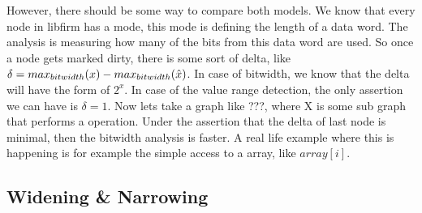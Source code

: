 However, there should be some way to compare both models. We know that every node in libfirm has a mode, this mode is defining the length of a data word. The analysis is measuring how many of the bits from this data word are used. So once a node gets marked dirty, there is some sort of delta, like $ \delta = max _{bitwidth}(\textsc{}x) - max _{bitwidth}(\hat{x}) $.
In case of bitwidth, we know that the delta will have the form of $2^x$. In case of the value range detection, the only assertion we can have is $\delta = 1$.
Now lets take a graph like ???, where X is some sub graph that performs a operation. Under the assertion that the delta of last node is minimal, then the bitwidth analysis is faster.
A real life example where this is happening is for example the simple access to a array, like $array[i]$.



\subsection{Widening \& Narrowing}



